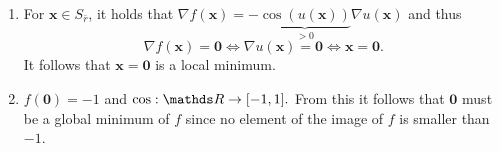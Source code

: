 \documentclass[a4paper]{article}
\begin{document}
{\begin{enumerate}
  For $\mathbf{x} \in S_{\bar{r}}$, it holds that $u(\mathbf{x}) \geq 0$, since $$0 \leq \frac{1}{2} (x_1 + x_2)^2 = \frac{1}{2}x_1^2 + \frac{1}{2}x_2^2 + x_1x_2 \leq x_1^2 + x_2^2 + x_1x_2 = u(\mathbf{x}),$$ and that $u(\mathbf{x}) < \pi/4$.
  This implies that $\cos(u(\mathbf{x})) > 0$ and $\sin(u(\mathbf{x})) \geq 0$. \\
  $\nabla u(\mathbf{x}) \nabla u(\mathbf{x})^\top$ is positive semi-definite since $$\mathbf{v}^\top \nabla u(\mathbf{x}) \nabla u(\mathbf{x})^\top \mathbf{v} = (\mathbf{v}^\top\nabla u(\mathbf{x}))^2 \geq 0.$$
  $\nabla^2 u(\mathbf{x})$ is positive definite since $$\mathbf{v}^\top \nabla^2 u(\mathbf{x}) \mathbf{v} = 2 v_1^2 + 2v_1v_2 + 2 v_2^2 = v_1^2 + v_2^2 + (v_1 + v_2)^2 \geq 0$$
  and equality only holds if $\mathbf{v} = \mathbf{0}$. \\
  So, in total, for $\mathbf{x} \in S_{\bar{r}}$, we have that
  \begin{equation*}
    \nabla^2 f(\mathbf{x}) = \underbrace{\cos(u(\mathbf{x}))}_{> 0} \underbrace{\nabla u(\mathbf{x}) \nabla u(\mathbf{x})^\top}_{\text{p.s.d.}} + \underbrace{\sin(u(\mathbf{x}))}_{\geq 0} \underbrace{\nabla^2 u(\mathbf{x})}_{\text{p.d.}}.
  \end{equation*}
  $\Rightarrow \nabla^2 f(\mathbf{x})$ is positive semi-definite. \\
  $\Rightarrow f_{|S_{\overline{r}}}$ is convex.
\item For $\mathbf{x} \in S_{\bar{r}}$, it holds that $\nabla f(\mathbf{x}) = -\underbrace{\cos(u(\mathbf{x}))}_{> 0} \nabla u(\mathbf{x})$ and thus $$\nabla f(\mathbf{x}) = \mathbf{0} \iff \nabla u(\mathbf{x}) = \mathbf{0} \iff \mathbf{x} = \mathbf{0}.$$
  It follows that $\mathbf{x} = \mathbf{0}$ is a local minimum.
\item $f(\mathbf{0}) = -1$ and $\cos: \R \rightarrow [-1, 1].$ From this it follows that $\mathbf{0}$ must be a global minimum of $f$ since no element of the image of $f$ is smaller than $-1$.
\end{enumerate}
}
\end{document}
